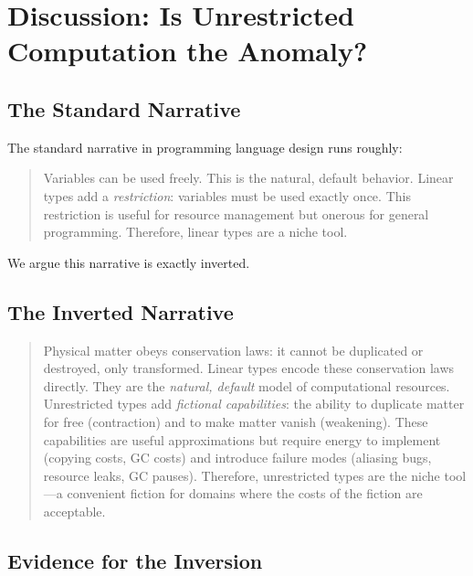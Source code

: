 \documentclass[11pt,a4paper]{article}
\begin{document}
\section{Discussion: Is Unrestricted Computation the Anomaly?}
\label{sec:inversion}

\subsection{The Standard Narrative}

The standard narrative in programming language design runs roughly:

\begin{quote}
Variables can be used freely. This is the natural, default behavior.
Linear types add a \emph{restriction}: variables must be used exactly
once. This restriction is useful for resource management but onerous
for general programming. Therefore, linear types are a niche tool.
\end{quote}

We argue this narrative is exactly inverted.

\subsection{The Inverted Narrative}

\begin{quote}
Physical matter obeys conservation laws: it cannot be duplicated or
destroyed, only transformed. Linear types encode these conservation
laws directly. They are the \emph{natural, default} model of
computational resources. Unrestricted types add \emph{fictional
capabilities}: the ability to duplicate matter for free (contraction)
and to make matter vanish (weakening). These capabilities are useful
approximations but require energy to implement (copying costs, GC
costs) and introduce failure modes (aliasing bugs, resource leaks,
GC pauses). Therefore, unrestricted types are the niche tool---a
convenient fiction for domains where the costs of the fiction are
acceptable.
\end{quote}

\subsection{Evidence for the Inversion}
\end{document}
